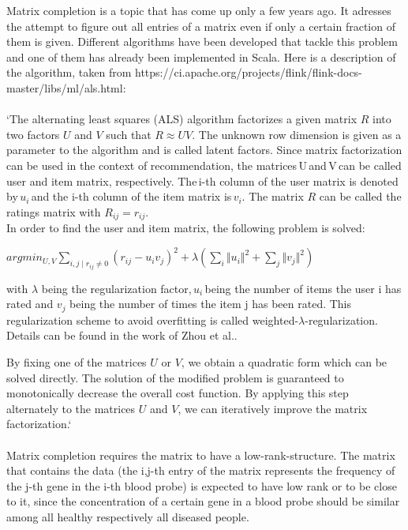 \documentclass{bioinfo}
\begin{document}
Matrix completion is a topic that has come up only a few years ago. It adresses the attempt to figure out all entries of a matrix even if only a certain fraction of them is given. Different algorithms have been developed that tackle this problem and one of them has already been implemented in Scala. Here is a description of the algorithm, taken from https://ci.apache.org/projects/flink/flink-docs-master/libs/ml/als.html: \\\\
`The alternating least squares (ALS) algorithm factorizes a given matrix $R$ into two factors $U$ and $V$ such that $R\approx UV$. The unknown row dimension is given as a parameter to the algorithm and is called latent factors. Since matrix factorization can be used in the context of recommendation, the matrices U and V can be called user and item matrix, respectively. The i-th column of the user matrix is denoted by $u_i$ and the i-th column of the item matrix is $v_i$. The matrix $R$ can be called the ratings matrix with $R_{ij} =r_{ij}$.\\
In order to find the user and item matrix, the following problem is solved: 

$ argmin_{U,V} \sum_{i,j\mid r_{ij} \neq0}(r_{ij}−u_i v_j)^{2}+\lambda(\sum_i \Vert u_i\Vert ^{2}+\sum_j \Vert v_j \Vert ^{2}) $

with $\lambda$ being the regularization factor, $u_i$ being the number of items the user i has rated and $v_j$ being the number of times the item j has been rated. This regularization scheme to avoid overfitting is called weighted-$\lambda$-regularization. Details can be found in the work of Zhou et al.. 

By fixing one of the matrices $U$ or $V$, we obtain a quadratic form which can be solved directly. The solution of the modified problem is guaranteed to monotonically decrease the overall cost function. By applying this step alternately to the matrices $U$ and $V$, we can iteratively improve the matrix factorization.`\\\\
Matrix completion requires the matrix to have a low-rank-structure. The matrix that contains the data (the i,j-th entry of the matrix represents the frequency of the j-th gene in the i-th blood probe) is expected to have low rank or to be close to it, since the concentration of a certain gene in a blood probe should be similar among all healthy respectively all diseased people. 

 
\end{document}
